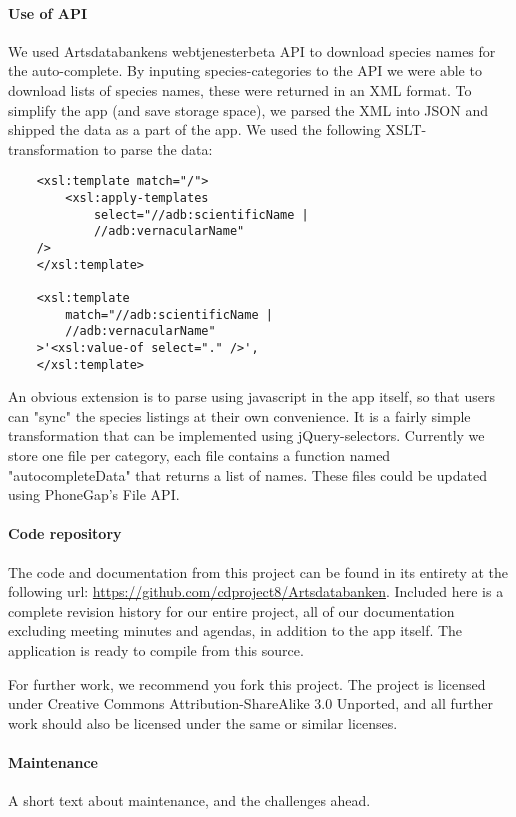 \paragraph{Use of API}\hspace{1mm}\newline

We used Artsdatabankens webtjenesterbeta API to download species names for the
auto-complete. By inputing species-categories to the API we were able to
download lists of species names, these were returned in an XML format. To
simplify the app (and save storage space), we parsed the XML into JSON and
shipped the data as a part of the app. We used the following XSLT-transformation
to parse the data:

\begin{lstlisting}
	<xsl:template match="/">
		<xsl:apply-templates 
			select="//adb:scientificName | 
			//adb:vernacularName" 
	/>
	</xsl:template>

	<xsl:template 
		match="//adb:scientificName | 
		//adb:vernacularName"
	>'<xsl:value-of select="." />',
	</xsl:template>
\end{lstlisting}

An obvious extension is to parse using javascript in the app itself, so
that users can "sync" the species listings at their own convenience. It is a
fairly simple transformation that can be implemented using jQuery-selectors.
Currently we store one file per category, each file contains a function named
"autocompleteData" that returns a list of names. These files could be updated
using PhoneGap's File API.

\paragraph{Code repository}\hspace{1mm}\newline

The code and documentation from this project can be found in its entirety at
the following url: \url{https://github.com/cdproject8/Artsdatabanken}. Included
here is a complete revision history for our entire project, all of our
documentation excluding meeting minutes and agendas, in addition to the app
itself. The application is ready to compile from this source.

For further work, we recommend you fork this project. The project is licensed
under Creative Commons Attribution-ShareAlike 3.0 Unported, and all further
work should also be licensed under the same or similar licenses.

\paragraph{Maintenance}\hspace{1mm}\newline

A short text about maintenance, and the challenges ahead.
